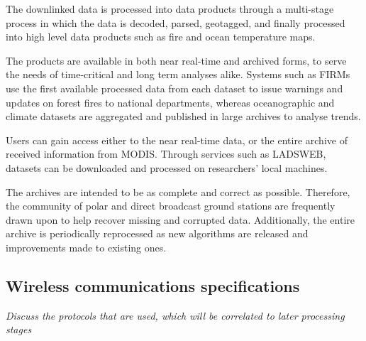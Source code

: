 The downlinked data is processed into data products through a multi-stage process in which the data is decoded, parsed, geotagged, and finally processed into high level data products such as fire and ocean temperature maps.

The products are available in both near real-time and archived forms, to serve the needs of time-critical and long term analyses alike.
Systems such as FIRMs use the first available processed data from each dataset to issue warnings and updates on forest fires to national departments, whereas oceanographic and climate datasets are aggregated and published in large archives to analyse trends.

Users can gain access either to the near real-time data, or the entire archive of received information from MODIS.  Through services such as LADSWEB, datasets can be downloaded and processed on researchers' local machines.

The archives are intended to be as complete and correct as possible.
Therefore, the community of polar and direct broadcast ground stations are frequently drawn upon to help recover missing and corrupted data.
Additionally, the entire archive is periodically reprocessed as new algorithms are released and improvements made to existing ones.


\subsection{Wireless communications specifications}
\textit{Discuss the protocols that are used, which will be correlated to later processing stages}




